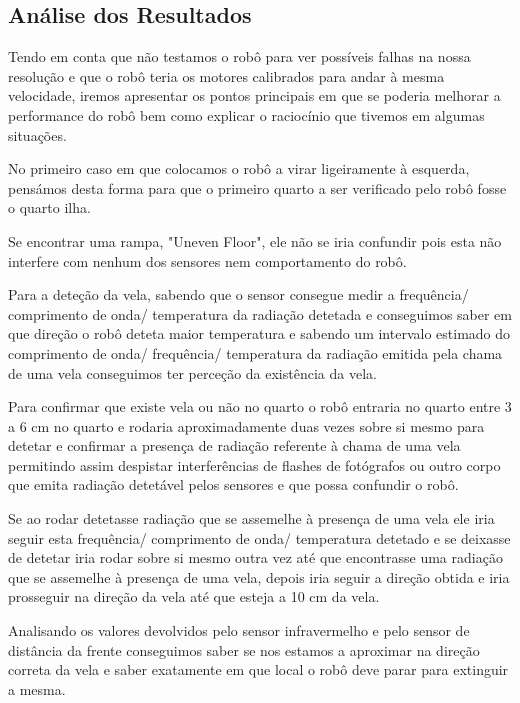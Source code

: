 \documentclass[pdftex,12pt,a4paper]{report}
\begin{document}
\subsection{Análise dos Resultados}

Tendo em conta que não testamos o robô para ver possíveis falhas na nossa resolução e que o robô teria os motores calibrados para andar à mesma velocidade, iremos apresentar os pontos principais em que se poderia melhorar a performance do robô bem como explicar o raciocínio que tivemos em algumas situações.

No primeiro caso em que colocamos o robô a virar ligeiramente à esquerda, pensámos desta forma para que o primeiro quarto a ser verificado pelo robô fosse o quarto ilha. 

Se encontrar uma rampa, "Uneven Floor", ele não se iria confundir pois esta não interfere com nenhum dos sensores nem comportamento do robô.

Para a deteção da vela, sabendo que o sensor consegue medir a frequência/ comprimento de onda/ temperatura da radiação detetada e conseguimos saber em que direção o robô deteta maior temperatura e sabendo um intervalo estimado\footnotemark{} do comprimento de onda/ frequência/ temperatura da radiação emitida pela chama de uma vela conseguimos ter perceção da existência da vela.

Para confirmar que existe vela ou não no quarto o robô entraria no quarto entre 3 a 6 cm no quarto e rodaria aproximadamente duas vezes sobre si mesmo para detetar e confirmar a presença de radiação referente à chama de uma vela permitindo assim despistar interferências de flashes de fotógrafos ou outro corpo que emita radiação detetável pelos sensores e que possa confundir o robô. 

Se ao rodar  detetasse radiação que se assemelhe à presença de uma vela ele iria  seguir esta frequência/ comprimento de onda/ temperatura detetado e se deixasse de detetar iria rodar sobre si mesmo outra vez até que encontrasse uma radiação que se assemelhe à presença de uma vela, depois iria seguir a direção obtida e iria prosseguir na direção da vela até que esteja a 10 cm da vela.
	
Analisando os valores devolvidos pelo sensor infravermelho e pelo sensor de distância da frente conseguimos saber se nos estamos a aproximar na direção correta da vela e saber exatamente em que local o robô deve parar para extinguir a mesma. 
\end{document}
